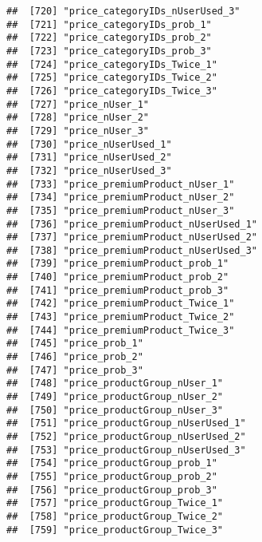 \documentclass[10pt]{report}
\begin{document}
\begin{verbatim}
##  [720] "price_categoryIDs_nUserUsed_3"                        
##  [721] "price_categoryIDs_prob_1"                             
##  [722] "price_categoryIDs_prob_2"                             
##  [723] "price_categoryIDs_prob_3"                             
##  [724] "price_categoryIDs_Twice_1"                            
##  [725] "price_categoryIDs_Twice_2"                            
##  [726] "price_categoryIDs_Twice_3"                            
##  [727] "price_nUser_1"                                        
##  [728] "price_nUser_2"                                        
##  [729] "price_nUser_3"                                        
##  [730] "price_nUserUsed_1"                                    
##  [731] "price_nUserUsed_2"                                    
##  [732] "price_nUserUsed_3"                                    
##  [733] "price_premiumProduct_nUser_1"                         
##  [734] "price_premiumProduct_nUser_2"                         
##  [735] "price_premiumProduct_nUser_3"                         
##  [736] "price_premiumProduct_nUserUsed_1"                     
##  [737] "price_premiumProduct_nUserUsed_2"                     
##  [738] "price_premiumProduct_nUserUsed_3"                     
##  [739] "price_premiumProduct_prob_1"                          
##  [740] "price_premiumProduct_prob_2"                          
##  [741] "price_premiumProduct_prob_3"                          
##  [742] "price_premiumProduct_Twice_1"                         
##  [743] "price_premiumProduct_Twice_2"                         
##  [744] "price_premiumProduct_Twice_3"                         
##  [745] "price_prob_1"                                         
##  [746] "price_prob_2"                                         
##  [747] "price_prob_3"                                         
##  [748] "price_productGroup_nUser_1"                           
##  [749] "price_productGroup_nUser_2"                           
##  [750] "price_productGroup_nUser_3"                           
##  [751] "price_productGroup_nUserUsed_1"                       
##  [752] "price_productGroup_nUserUsed_2"                       
##  [753] "price_productGroup_nUserUsed_3"                       
##  [754] "price_productGroup_prob_1"                            
##  [755] "price_productGroup_prob_2"                            
##  [756] "price_productGroup_prob_3"                            
##  [757] "price_productGroup_Twice_1"                           
##  [758] "price_productGroup_Twice_2"                           
##  [759] "price_productGroup_Twice_3"                           

\end{verbatim}
\end{document}
